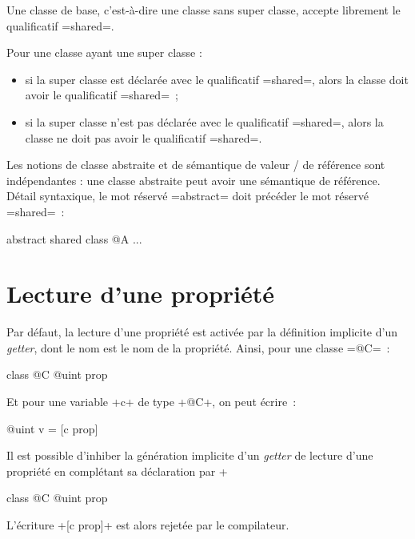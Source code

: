 Une classe de base, c'est-à-dire une classe sans super classe, accepte librement le qualificatif \ggs=shared=.

Pour une classe ayant une super classe :
\begin{itemize}
  \item si la super classe est déclarée avec le qualificatif \ggs=shared=, alors la classe doit avoir le qualificatif \ggs=shared=~;
  \item si la super classe n'est pas déclarée avec le qualificatif \ggs=shared=, alors la classe ne doit pas avoir le qualificatif \ggs=shared=.
\end{itemize}

Les notions de classe abstraite et de sémantique de valeur / de référence sont indépendantes : une classe abstraite peut avoir une sémantique de référence. Détail syntaxique, le mot réservé \ggs=abstract= doit précéder le mot réservé \ggs=shared=~:

abstract shared class @A {
  ...
}








\section{Lecture d'une propriété}

Par défaut, la lecture d'une propriété est activée par la définition implicite d'un \emph{getter}, dont le nom est le nom de la propriété. Ainsi, pour une classe \ggs=@C=~:

\begin{galgas}
class @C {
  @uint prop
}
\end{galgas}

Et pour une variable \ggs+c+ de type \ggs+@C+, on peut écrire~:

\begin{galgas}
@uint v = [c prop]
\end{galgas}

Il est possible d'inhiber la génération implicite d'un \emph{getter} de lecture d'une propriété en complétant sa déclaration par \ggs+%

\begin{galgas}
class @C {
  @uint prop %
}
\end{galgas}

L'écriture \ggs+[c prop]+ est alors rejetée par le compilateur.









